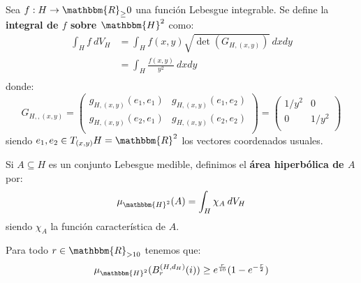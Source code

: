 \documentclass[12pt]{report}
\newcounter{it}
\theoremstyle{largebreak}
\newcommand\cf[3]{\ensuremath{#1:#2\rightarrow#3}}
\newcommand{\bbm}[1]{\ensuremath{\mathbbm{#1}}}
\begin{document}
    \begin{mydef}
        Sea $\cf{f}{H}{\bbm{R}_\geq0}$ una función Lebesgue integrable. Se define la \textbf{integral de $f$ sobre $\bbm{H}^2$} como:
        \begin{equation*}
            \begin{split}
                \int_{H}f\:dV_H&=\int_{H}f(x,y)\sqrt{\det(G_{H,(x,y)})}\:dxdy\\
                &=\int_{H}\frac{f(x,y)}{y^2}\:dxdy\\
            \end{split}
        \end{equation*}
        donde:
        \begin{equation*}
            G_{ H,,(x,y)}=\left(\begin{array}{cc}
                g_{ H,(x,y)}(e_1,e_1) & g_{ H,(x,y)}(e_1,e_2) \\
                g_{ H,(x,y)}(e_2,e_1) & g_{ H,(x,y)}(e_2,e_2) \\
            \end{array} \right)=\left(\begin{array}{cc}
                1/y^2 & 0 \\
                0 & 1/y^2 \\
            \end{array} \right)
        \end{equation*}
        siendo $e_1,e_2\in T_{(x,y)}H=\bbm{R}^2$ los vectores coordenados usuales.

        Si $A\subseteq H$ es un conjunto Lebesgue medible, definimos el \textbf{área hiperbólica de $A$} por:
        \begin{equation*}
            \mu_{\bbm{H}^2}(A)=\int_{H}\chi_A\:dV_H
        \end{equation*}
        siendo $\chi_A$ la función característica de $A$.
    \end{mydef}

    \begin{propo}
        Para todo $r\in\bbm{R}_{>10}$ tenemos que:
        \begin{equation*}
            \mu_{\bbm{H}^2}(B_r^{(H,d_H)}(i))\geq e^{\frac{r}{10}}(1-e^{-\frac{r}{2}})
        \end{equation*}
    \end{propo}
\end{document}

